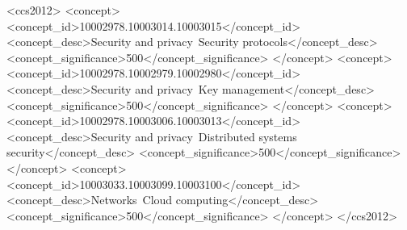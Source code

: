 \documentclass[sigconf,nonacm]{acmart}
\begin{document}
\renewcommand{\shortauthors}{Berthoud et al.}

\begin{abstract}

\end{abstract}

\begin{CCSXML}
<ccs2012>
   <concept>
       <concept_id>10002978.10003014.10003015</concept_id>
       <concept_desc>Security and privacy~Security protocols</concept_desc>
       <concept_significance>500</concept_significance>
       </concept>
   <concept>
       <concept_id>10002978.10002979.10002980</concept_id>
       <concept_desc>Security and privacy~Key management</concept_desc>
       <concept_significance>500</concept_significance>
       </concept>
   <concept>
       <concept_id>10002978.10003006.10003013</concept_id>
       <concept_desc>Security and privacy~Distributed systems security</concept_desc>
       <concept_significance>500</concept_significance>
       </concept>
   <concept>
       <concept_id>10003033.10003099.10003100</concept_id>
       <concept_desc>Networks~Cloud computing</concept_desc>
       <concept_significance>500</concept_significance>
       </concept>
 </ccs2012>
\end{CCSXML}
\end{document}
